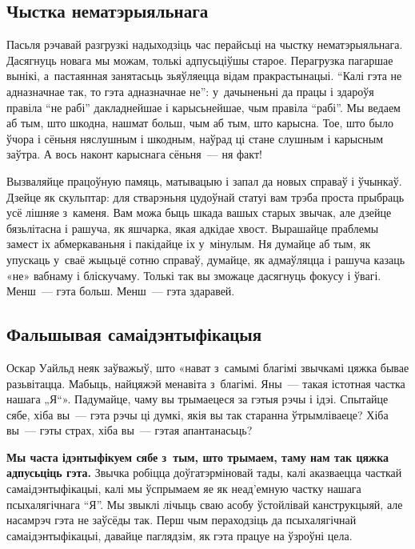 \subsection*{Чыстка нематэрыяльнага}

Пасьля рэчавай разгрузкі надыходзіць час перайсьці на чыстку нематэрыяльнага. Дасягнуць новага мы можам, толькі адпусьціўшы старое. Перагрузка пагаршае вынікі, а~пастаянная занятасьць зьяўляецца відам пракрастынацыі. ``Калі гэта не адназначнае так, то гэта адназначнае не'': у~дачыненьні да працы і здароўя правіла ``не рабі'' дакладнейшае і карысьнейшае, чым правіла ``рабі''. Мы ведаем аб тым, што шкодна, нашмат больш, чым аб тым, што карысна. Тое, што было ўчора і сёньня няслушным і шкодным, наўрад ці стане слушным і карысным заўтра. А вось наконт карыснага сёньня~--- ня факт!

Вызваляйце працоўную памяць, матывацыю і запал да новых справаў і ўчынкаў. Дзейце як скульптар: для стварэньня цудоўнай статуі вам трэба проста прыбраць усё лішняе з~каменя. Вам можа быць шкада вашых старых звычак, але дзейце бязьлітасна і рашуча, як яшчарка, якая адкідае хвост. Вырашайце праблемы замест іх абмеркаваньня і пакідайце іх у~мінулым. Ня думайце аб тым, як упускаць у~сваё жыцьцё сотню справаў, думайце, як адмаўляцца і рашуча казаць «не» вабнаму і бліскучаму. Толькі так вы зможаце дасягнуць фокусу і ўвагі. Менш~--- гэта больш. Менш~--- гэта здаравей.

\subsection*{Фальшывая самаідэнтыфікацыя}

Оскар Уайльд неяк заўважыў, што «нават з~самымі благімі звычкамі цяжка бывае разьвітацца. Мабыць, найцяжэй менавіта з~благімі. Яны~--- такая істотная частка нашага „Я“». Падумайце, чаму вы трымаецеся за гэтыя рэчы і ідэі. Спытайце сябе, хіба вы~--- гэта рэчы ці думкі, якія вы так старанна ўтрымліваеце? Хіба вы~--- гэты страх, хіба вы~--- гэтая апантанасьць?

\textbf{Мы часта ідэнтыфікуем сябе з~тым, што трымаем, таму нам так цяжка адпусьціць гэта.} Звычка робіцца доўгатэрміновай тады, калі аказваецца часткай самаідэнтыфікацыі, калі мы ўспрымаем яе як неад'емную частку нашага псыхалягічнага ``Я''. Мы звыклі лічыць сваю асобу ўстойлівай канструкцыяй, але насамрэч гэта не заўсёды так. Перш чым пераходзіць да псыхалягічнай самаідэнтыфікацыі, давайце паглядзім, як гэта працуе на ўзроўні цела.

